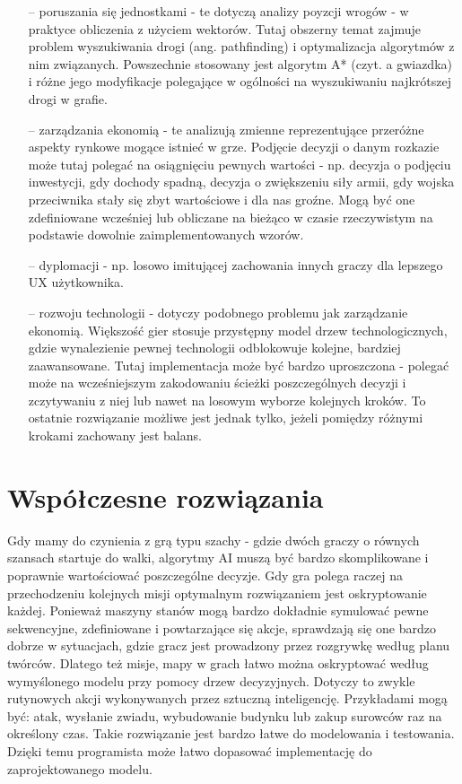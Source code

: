 \documentclass[12pt]{report}
\begin{document}
\begin{itemize}
\item[--] poruszania się jednostkami - te dotyczą analizy poyzcji wrogów - w praktyce obliczenia z użyciem wektorów. Tutaj obszerny temat zajmuje problem wyszukiwania drogi (ang. pathfinding) i optymalizacja algorytmów z nim związanych. Powszechnie stosowany jest algorytm A* (czyt. a gwiazdka) i różne jego modyfikacje polegające w ogólności na wyszukiwaniu najkrótszej drogi w grafie. 
\item[--] zarządzania ekonomią - te analizują zmienne reprezentujące przeróżne aspekty rynkowe mogące istnieć w grze. Podjęcie decyzji o danym rozkazie może tutaj polegać na osiągnięciu pewnych wartości - np. decyzja o podjęciu inwestycji, gdy dochody spadną, decyzja o zwiększeniu siły armii, gdy wojska przeciwnika stały się zbyt wartościowe i dla nas groźne. Mogą być one zdefiniowane wcześniej lub obliczane na bieżąco w czasie rzeczywistym na podstawie dowolnie zaimplementowanych wzorów.
\item[--] dyplomacji - np. losowo imitującej zachowania innych graczy dla lepszego UX użytkownika.
\item[--] rozwoju technologii - dotyczy podobnego problemu jak zarządzanie ekonomią. Większość gier stosuje przystępny model drzew technologicznych, gdzie wynalezienie pewnej technologii odblokowuje kolejne, bardziej zaawansowane. Tutaj implementacja może być bardzo uproszczona - polegać może na wcześniejszym zakodowaniu ścieżki poszczególnych decyzji i zczytywaniu z niej lub nawet na losowym wyborze kolejnych kroków. To ostatnie rozwiązanie możliwe jest jednak tylko, jeżeli pomiędzy różnymi krokami zachowany jest balans.
\end{itemize}


\section {Współczesne rozwiązania} 
Gdy mamy do czynienia z grą typu szachy - gdzie dwóch graczy o równych szansach startuje do walki, algorytmy AI muszą być bardzo skomplikowane i poprawnie wartościować poszczególne decyzje. Gdy gra polega raczej na przechodzeniu kolejnych misji optymalnym rozwiązaniem jest oskryptowanie każdej. Ponieważ maszyny stanów mogą bardzo dokładnie symulować pewne sekwencyjne, zdefiniowane i powtarzające się akcje, sprawdzają się one bardzo dobrze w sytuacjach, gdzie gracz jest prowadzony przez rozgrywkę według planu twórców. Dlatego też misje, mapy w grach łatwo można oskryptować według wymyślonego modelu przy pomocy drzew decyzyjnych. Dotyczy to zwykle rutynowych akcji wykonywanych przez sztuczną inteligencję. Przykładami mogą być: atak, wysłanie zwiadu, wybudowanie budynku lub zakup surowców raz na określony czas. Takie rozwiązanie jest bardzo łatwe do modelowania i testowania. Dzięki temu programista może łatwo dopasować implementację do zaprojektowanego modelu. 
\end{document}
